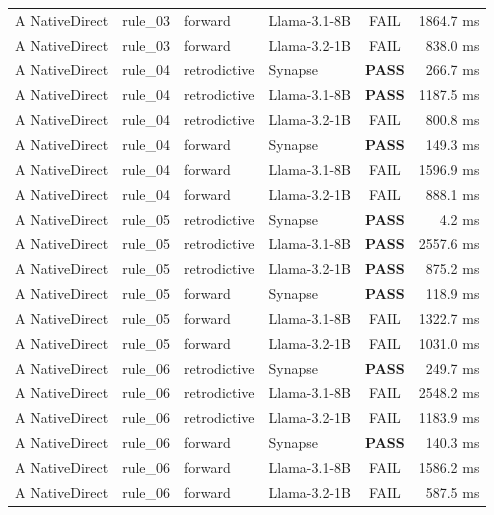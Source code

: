 {\begin{longtable}{p{2.2cm} p{1.2cm} p{2.0cm} p{3.8cm} c r}
A NativeDirect & rule\_03 & forward & Llama-3.1-8B & \color{gray}FAIL & 1864.7 ms \\
A NativeDirect & rule\_03 & forward & Llama-3.2-1B & \color{gray}FAIL & 838.0 ms \\
A NativeDirect & rule\_04 & retrodictive & Synapse & \textbf{\color{passgreen}PASS} & 266.7 ms \\
A NativeDirect & rule\_04 & retrodictive & Llama-3.1-8B & \textbf{\color{passgreen}PASS} & 1187.5 ms \\
A NativeDirect & rule\_04 & retrodictive & Llama-3.2-1B & \color{gray}FAIL & 800.8 ms \\
A NativeDirect & rule\_04 & forward & Synapse & \textbf{\color{passgreen}PASS} & 149.3 ms \\
A NativeDirect & rule\_04 & forward & Llama-3.1-8B & \color{gray}FAIL & 1596.9 ms \\
A NativeDirect & rule\_04 & forward & Llama-3.2-1B & \color{gray}FAIL & 888.1 ms \\
A NativeDirect & rule\_05 & retrodictive & Synapse & \textbf{\color{passgreen}PASS} & 4.2 ms \\
A NativeDirect & rule\_05 & retrodictive & Llama-3.1-8B & \textbf{\color{passgreen}PASS} & 2557.6 ms \\
A NativeDirect & rule\_05 & retrodictive & Llama-3.2-1B & \textbf{\color{passgreen}PASS} & 875.2 ms \\
A NativeDirect & rule\_05 & forward & Synapse & \textbf{\color{passgreen}PASS} & 118.9 ms \\
A NativeDirect & rule\_05 & forward & Llama-3.1-8B & \color{gray}FAIL & 1322.7 ms \\
A NativeDirect & rule\_05 & forward & Llama-3.2-1B & \color{gray}FAIL & 1031.0 ms \\
A NativeDirect & rule\_06 & retrodictive & Synapse & \textbf{\color{passgreen}PASS} & 249.7 ms \\
A NativeDirect & rule\_06 & retrodictive & Llama-3.1-8B & \color{gray}FAIL & 2548.2 ms \\
A NativeDirect & rule\_06 & retrodictive & Llama-3.2-1B & \color{gray}FAIL & 1183.9 ms \\
A NativeDirect & rule\_06 & forward & Synapse & \textbf{\color{passgreen}PASS} & 140.3 ms \\
A NativeDirect & rule\_06 & forward & Llama-3.1-8B & \color{gray}FAIL & 1586.2 ms \\
A NativeDirect & rule\_06 & forward & Llama-3.2-1B & \color{gray}FAIL & 587.5 ms \\

\end{longtable}}

